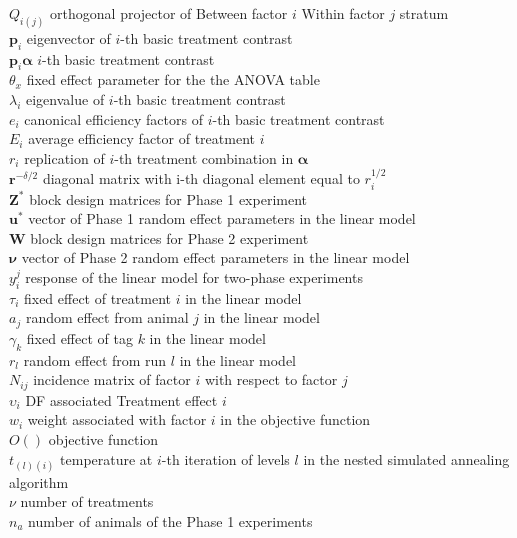 \begin{tabbing}
$Q_{i(j)}$ \> orthogonal projector of Between factor $i$ Within factor $j$ stratum \\
$\bm{p}_{i}$ \> eigenvector of $i$-th basic treatment contrast\\
$\bm{p}_{i}\bm{\alpha}$ \> $i$-th basic treatment contrast \\
$\theta_x$ \> fixed effect parameter for the the ANOVA table \\
$\lambda_i$ \> eigenvalue of $i$-th basic treatment contrast \\
$e_{i}$ \> canonical efficiency factors of $i$-th basic treatment contrast\\
$E_{i}$ \> average efficiency factor of treatment $i$\\
$r_{i}$ \> replication of $i$-th treatment combination in $\bm{\alpha}$\\
$\bm{r}^{-\delta/2}$ \>  diagonal matrix with i-th diagonal element equal to $r^{1/2}_i$\\
$\textbf{Z}^{*}$ \> block design matrices for Phase 1 experiment\\
$\bm{u}^{*}$ \> vector of Phase 1 random effect parameters in the linear model\\
$\textbf{W}$ \> block design matrices for Phase 2 experiment\\
$\bm{\nu}$ \> vector of Phase 2 random effect parameters in the linear model\\
$y_i^j$ \> response of the linear model for two-phase experiments\\
$\tau_i$ \> fixed effect of treatment $i$ in the linear model \\
$a_j$ \> random effect from animal $j$ in the linear model \\
$\gamma_k$ \> fixed effect of tag $k$ in the linear model \\
$r_l$ \> random effect from run $l$ in the linear model \\
$N_{ij}$ \> incidence matrix  of factor $i$ with respect to factor $j$\\
$\upsilon_i$ \> DF associated Treatment effect $i$ \\ 
$w_{i}$ \> weight associated with factor $i$ in the objective function \\
$O()$ \> objective function \\
$t_{(l)(i)}$ \> temperature at $i$-th iteration of levels $l$ in the nested simulated annealing algorithm \\
$\nu$ \> number of treatments\\
$n_a$ \> number of animals of the Phase 1 experiments\\

\end{tabbing}
